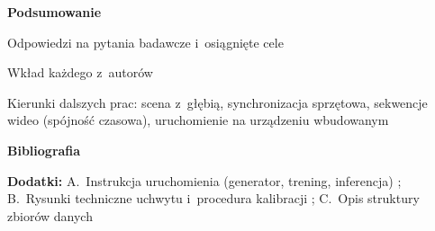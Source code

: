 \begin{toc}
\item \textbf{Podsumowanie} \WS
  \begin{toc}
    \item Odpowiedzi na pytania badawcze i~osiągnięte cele
    \item Wkład każdego z~autorów
    \item Kierunki dalszych prac: scena z~głębią, synchronizacja sprzętowa, sekwencje wideo
          (spójność czasowa), uruchomienie na urządzeniu wbudowanym
  \end{toc}

\item[] \textbf{Bibliografia}
\item[] \textbf{Dodatki:} A.~Instrukcja uruchomienia (generator, trening, inferencja) \IK;
        B.~Rysunki techniczne uchwytu i~procedura kalibracji \HW; C.~Opis struktury zbiorów danych \WS
\end{toc}
